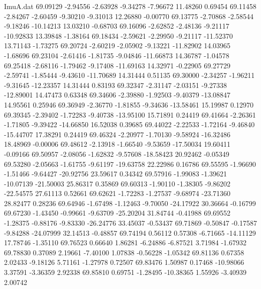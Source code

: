 \begin{filecontents}{ImuA.dat}
  69.09129   -2.94556   -2.63928   -9.34278   -7.96672   11.48260    0.69454
  69.11458   -2.84267   -2.60459   -9.30210   -9.31013   12.26880   -0.00770
  69.13775   -2.70868   -2.58544   -9.18246  -10.14213   13.03210   -0.68703
  69.16096   -2.62852   -2.48136   -9.21117  -10.92833   13.39848   -1.38164
  69.18434   -2.59621   -2.29950   -9.21117  -11.52370   13.71143   -1.73275
  69.20724   -2.60219   -2.05902   -9.13221  -11.82902   14.03965   -1.68696
  69.23104   -2.61416   -1.81735   -9.04846  -11.66873   14.36787   -1.04578
  69.25418   -2.68116   -1.79462   -9.17408  -11.69163   14.32971   -0.22905
  69.27729   -2.59741   -1.85444   -9.43610  -11.70689   14.31444    0.51135
  69.30000   -2.34257   -1.96211   -9.31645  -12.23357   14.31444    0.83193
  69.32347   -2.31147   -2.03151   -9.27338  -12.89001   14.47473    0.63348
  69.34606   -2.39880   -1.92503   -9.40379  -13.08847   14.95561    0.25946
  69.36949   -2.36770   -1.81855   -9.34636  -13.58461   15.19987    0.12970
  69.39345   -2.39402   -1.72283   -9.40738  -13.95100   15.71891    0.24419
  69.41664   -2.26361   -1.71805   -9.39422  -14.66850   16.52038    0.39685
  69.44022   -2.22533   -1.72164   -9.46840  -15.44707   17.38291    0.24419
  69.46324   -2.20977   -1.70130   -9.58924  -16.32486   18.48969   -0.00006
  69.48612   -2.13918   -1.66540   -9.53659  -17.50034   19.60411   -0.09166
  69.50957   -2.08056   -1.62832   -9.57608  -18.58423   20.92462   -0.05349
  69.53280   -2.05663   -1.61755   -9.61197  -19.63758   22.22986    0.16786
  69.55595   -1.96690   -1.51466   -9.64427  -20.92756   23.59617    0.34342
  69.57916   -1.99083   -1.39621  -10.07139  -21.50003   25.86317    0.35869
  69.60313   -1.90110   -1.38305   -9.86202  -22.54575   27.61113    0.52661
  69.62621   -1.72283   -1.27537   -9.68974  -23.71360   28.82477    0.28236
  69.64946   -1.67498   -1.12463   -9.70050  -24.17922   30.36664   -0.16799
  69.67230   -1.43450   -0.99661   -9.63709  -25.20204   31.84744   -0.41988
  69.69552   -1.28375   -0.88176   -9.83330  -26.24776   33.45037   -0.53437
  69.71869   -0.50847   -0.17587   -9.84288  -24.07999   32.14513   -0.48857
  69.74194    0.56112    0.57308   -6.71665  -14.11129   17.78746   -1.35110
  69.76523    0.66640    1.86281   -6.24886   -6.87521    3.71984   -1.67932
  69.78830    0.37089    2.19661   -7.40100    1.07838   -0.56228   -1.05342
  69.81136    0.67358    2.02433   -9.18126    5.71161   -1.27978    0.72507
  69.83476    1.50987    0.17468  -10.98066    3.37591   -3.36359    2.92338
  69.85810    0.69751   -1.28495  -10.38365    1.55926   -3.40939    2.00742

\end{filecontents}
